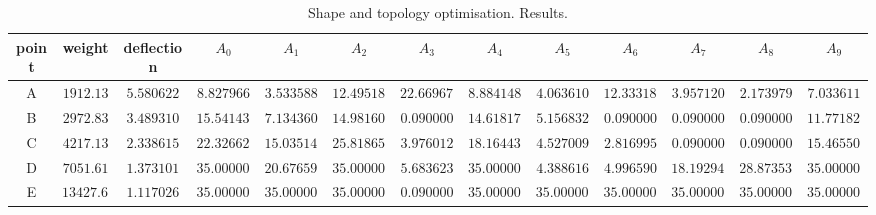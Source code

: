 \begin{table*} \centering
\caption{Shape and topology optimisation. Results.}
\scriptsize \setlength{\tabcolsep}{0.5em}
\begin{tabular}[c]{ccccccccccccc} \toprule
point & weight & deflection &  $A_0$ & $A_1$ & $A_2$ & $A_3$ & $A_4$ & $A_5$ & $A_6$ & $A_7$ & $A_8$ & $A_9$   \\ \hline
A & $1912.13$ & $5.580622$ &  $8.827966$ & $3.533588$ & $12.495180$ & $22.669679$ & $8.884148$  &  $4.063610$ & $12.333181$ & $3.957120$ & $2.173979$ & $7.033611$ \\
B & $2972.83$ & $3.489310$ &  $15.541437$ & $7.134360$ & $14.981606$ & $0.090000$ & $14.618174$  &  $5.156832$ & $0.090000$ & $0.090000$ & $0.090000$ & $11.771825$ \\
C & $4217.13$ & $2.338615$ &  $22.326627$ & $15.035148$ & $25.818657$ & $3.976012$ & $18.164431$ &  $4.527009$ & $2.816995$ & $0.090000$ & $0.090000$ & $15.465500$ \\
D & $7051.61$ & $1.373101$ &  $35.000000$ & $20.676599$ & $35.000000$ & $5.683623$ & $35.000000$  &  $4.388616$ & $4.996590$ & $18.192946$ & $28.873534$ & $35.000000$ \\
E & $13427.64$ & $1.117026$ &  $35.000000$ & $35.000000$ & $35.000000$ & $0.090000$ & $35.000000$ &  $35.000000$ & $35.000000$ & $35.000000$ & $35.000000$ & $35.000000$ \\

\bottomrule
\end{tabular}
\label{tab:topoFront}
\end{table*}

